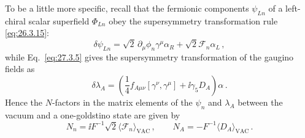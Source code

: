 To be a little more specific, recall that the fermionic components
\(\psi_{Ln}\) of a left-chiral scalar superfield \(\Phi_{Ln}\) obey the
supersymmetry transformation rule \eqref{eq:26.3.15}:
\begin{equation}
  \delta\psi_{Ln}
  =\sqrt{2}\,\partial_\mu\phi_n\gamma^\mu\alpha_R
  +\sqrt{2}\mathcal{F}_n\alpha_L\,,
  \tag{29.2.30}\label{eq:29.2.30}
\end{equation}
while Eq.~\eqref{eq:27.3.5} gives the supersymmetry transformation of the
gaugino fields as
\begin{equation}
  \delta\lambda_A
  =
  \left(
    \frac14f_{A\mu\nu}[\gamma^\nu,\gamma^\mu]
    +\ii\gamma_5D_A
  \right)\alpha\,.
  \tag{29.2.31}\label{eq:29.2.31}
\end{equation}
Hence the \(N\)-factors in the matrix elements of the \(\psi_n\) and
\(\lambda_A\) between the vacuum and a one-goldstino state are given by
\begin{equation}
  N_n
  =\ii F^{-1}\sqrt{2}
    \langle\mathcal{F}_n\rangle_{\mathrm{VAC}}\,,
  \qquad
  N_A
  =-F^{-1}\langle D_A\rangle_{\mathrm{VAC}}\,.
  \tag{29.2.32}\label{eq:29.2.32}
\end{equation}

